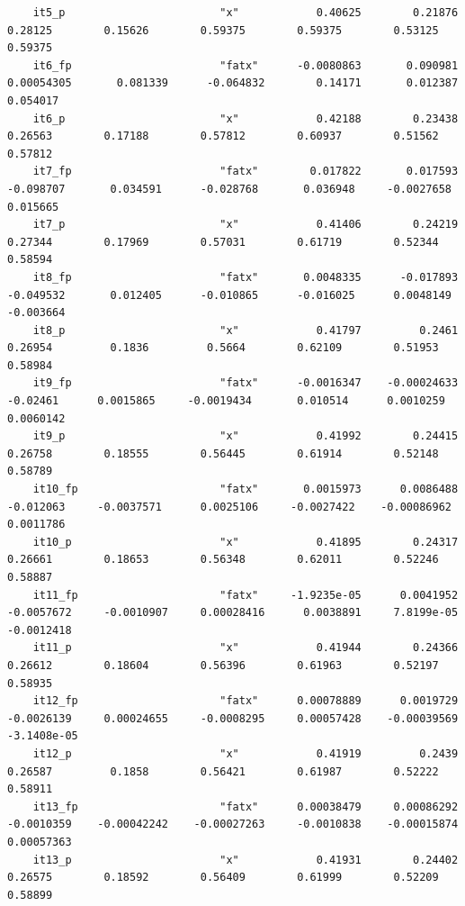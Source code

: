 \documentclass[
]{book}
\begin{document}
\begin{verbatim}
    it5_p                        "x"            0.40625        0.21876        0.28125        0.15626        0.59375        0.59375        0.53125        0.59375
    it6_fp                       "fatx"      -0.0080863       0.090981     0.00054305       0.081339      -0.064832        0.14171       0.012387       0.054017
    it6_p                        "x"            0.42188        0.23438        0.26563        0.17188        0.57812        0.60937        0.51562        0.57812
    it7_fp                       "fatx"        0.017822       0.017593      -0.098707       0.034591      -0.028768       0.036948     -0.0027658       0.015665
    it7_p                        "x"            0.41406        0.24219        0.27344        0.17969        0.57031        0.61719        0.52344        0.58594
    it8_fp                       "fatx"       0.0048335      -0.017893      -0.049532       0.012405      -0.010865      -0.016025      0.0048149      -0.003664
    it8_p                        "x"            0.41797         0.2461        0.26954         0.1836         0.5664        0.62109        0.51953        0.58984
    it9_fp                       "fatx"      -0.0016347    -0.00024633       -0.02461      0.0015865     -0.0019434       0.010514      0.0010259      0.0060142
    it9_p                        "x"            0.41992        0.24415        0.26758        0.18555        0.56445        0.61914        0.52148        0.58789
    it10_fp                      "fatx"       0.0015973      0.0086488      -0.012063     -0.0037571      0.0025106     -0.0027422    -0.00086962      0.0011786
    it10_p                       "x"            0.41895        0.24317        0.26661        0.18653        0.56348        0.62011        0.52246        0.58887
    it11_fp                      "fatx"     -1.9235e-05      0.0041952     -0.0057672     -0.0010907     0.00028416      0.0038891     7.8199e-05     -0.0012418
    it11_p                       "x"            0.41944        0.24366        0.26612        0.18604        0.56396        0.61963        0.52197        0.58935
    it12_fp                      "fatx"      0.00078889      0.0019729     -0.0026139     0.00024655     -0.0008295     0.00057428    -0.00039569    -3.1408e-05
    it12_p                       "x"            0.41919         0.2439        0.26587         0.1858        0.56421        0.61987        0.52222        0.58911
    it13_fp                      "fatx"      0.00038479     0.00086292     -0.0010359    -0.00042242    -0.00027263     -0.0010838    -0.00015874     0.00057363
    it13_p                       "x"            0.41931        0.24402        0.26575        0.18592        0.56409        0.61999        0.52209        0.58899

\end{verbatim}
\end{document}
